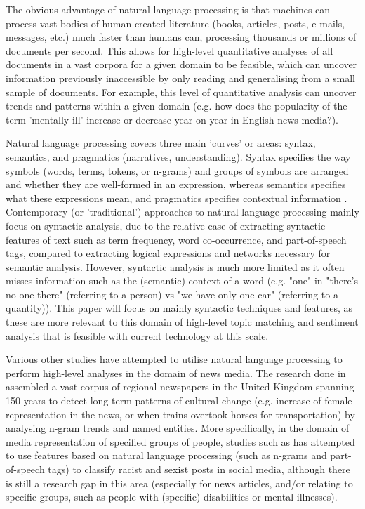 \documentclass{report}
\begin{document}
The obvious advantage of natural language processing is that machines can process vast bodies of human-created literature (books, articles, posts, e-mails, messages, etc.) much faster than humans can, processing thousands or millions of documents per second. 
This allows for high-level quantitative analyses of all documents in a vast corpora for a given domain to be feasible, which can uncover information previously inaccessible by only reading and generalising from a small sample of documents.
For example, this level of quantitative analysis can uncover trends and patterns within a given domain (e.g. how does the popularity of the term 'mentally ill' increase or decrease year-on-year in English news media?). 

Natural language processing covers three main 'curves' or areas:  syntax, semantics, and pragmatics (narratives, understanding). 
Syntax specifies the way symbols (words, terms, tokens, or n-grams) and groups of symbols are arranged and whether they are well-formed in an expression, whereas semantics specifies what these expressions mean, and pragmatics specifies contextual information \cite{cambria2014jumping}.
Contemporary (or 'traditional') approaches to natural language processing mainly focus on syntactic analysis, due to the relative ease of extracting syntactic features of text such as term frequency, word co-occurrence, and part-of-speech tags, compared to extracting logical expressions and networks necessary for semantic analysis.
However, syntactic analysis is much more limited as it often misses information such as the (semantic) context of a word (e.g. "one" in "there's no one there" (referring to a person) vs "we have only one car" (referring to a quantity)).
This paper will focus on mainly syntactic techniques and features, as these are more relevant to this domain of high-level topic matching and sentiment analysis that is feasible with current technology at this scale.

Various other studies have attempted to utilise natural language processing to perform high-level analyses in the domain of news media.
The research done in \cite{lansdall2017content} assembled a vast corpus of regional newspapers in the United Kingdom spanning 150 years to detect long-term patterns of cultural change (e.g. increase of female representation in the news, or when trains overtook horses for transportation) by analysing n-gram trends and named entities. 
More specifically, in the domain of media representation of specified groups of people, studies such as \cite{waseem2016you} has attempted to use features based on natural language processing (such as n-grams and part-of-speech tags) to classify racist and sexist posts in social media, although there is still a research gap in this area (especially for news articles, and/or relating to specific groups, such as people with (specific) disabilities or mental illnesses).
\end{document}
